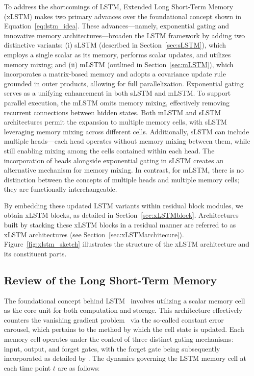 To address the shortcomings of LSTM, Extended Long Short-Term Memory (xLSTM) makes two primary advances over the foundational concept shown in Equation~\eqref{eq:lstm_idea}. These advances—namely, exponential gating and innovative memory architectures—broaden the LSTM framework by adding two distinctive variants: (i) sLSTM (described in Section~\ref{sec:sLSTM}), which employs a single scalar as its memory, performs scalar updates, and utilizes memory mixing; and (ii) mLSTM (outlined in Section~\ref{sec:mLSTM}), which incorporates a matrix-based memory and adopts a covariance update rule grounded in outer products, allowing for full parallelization. Exponential gating serves as a unifying enhancement in both sLSTM and mLSTM. To support parallel execution, the mLSTM omits memory mixing, effectively removing recurrent connections between hidden states. Both mLSTM and sLSTM architectures permit the expansion to multiple memory cells, with sLSTM leveraging memory mixing across different cells. Additionally, sLSTM can include multiple heads—each head operates without memory mixing between them, while still enabling mixing among the cells contained within each head. The incorporation of heads alongside exponential gating in sLSTM creates an alternative mechanism for memory mixing. In contrast, for mLSTM, there is no distinction between the concepts of multiple heads and multiple memory cells; they are functionally interchangeable.

By embedding these updated LSTM variants within residual block modules, we obtain xLSTM blocks, as detailed in Section~\ref{sec:xLSTMblock}. Architectures built by stacking these xLSTM blocks in a residual manner are referred to as xLSTM architectures (see Section~\ref{sec:xLSTMarchitecure}). Figure~\ref{fig:xlstm_sketch} illustrates the structure of the xLSTM architecture and its constituent parts.

\subsection{Review of the Long Short-Term Memory}
\label{sec:orgLSTM}

The foundational concept behind LSTM~\citep{Hochreiter:91,Hochreiter:97nips,Hochreiter:97} involves utilizing a scalar memory cell as the core unit for both computation and storage. This architecture effectively counters the vanishing gradient problem~\citep{Hochreiter:91,Hochreiter:00book} via the so-called constant error carousel, which pertains to the method by which the cell state is updated. Each memory cell operates under the control of three distinct gating mechanisms: input, output, and forget gates, with the forget gate being subsequently incorporated as detailed by \citet{Gers:00}. The dynamics governing the LSTM memory cell at each time point $t$ are as follows:

